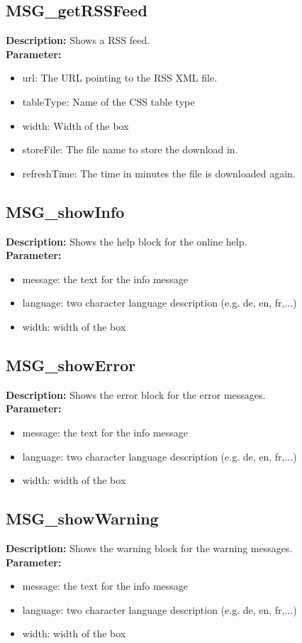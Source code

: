 \subsection{MSG\_getRSSFeed}
\textbf{Description:} Shows a RSS feed.\\
\textbf{Parameter:}
\begin{itemize}
\item url: The URL pointing to the RSS XML file.
\item tableType: Name of the CSS table type
\item width: Width of the box
\item storeFile: The file name to store the download in.
\item refreshTime: The time in minutes the file is downloaded again.
\end{itemize}

\subsection{MSG\_showInfo}
\textbf{Description:} Shows the help block for the online help.\\
\textbf{Parameter:}
\begin{itemize}
\item message: the text for the info message
\item language: two character language description (e.g. de, en, fr,...)
\item width: width of the box
\end{itemize}

\subsection{MSG\_showError}
\textbf{Description:} Shows the error block for the error messages.\\
\textbf{Parameter:}
\begin{itemize}
\item message: the text for the info message
\item language: two character language description (e.g. de, en, fr,...)
\item width: width of the box
\end{itemize}

\subsection{MSG\_showWarning}
\textbf{Description:} Shows the warning block for the warning messages.\\
\textbf{Parameter:}
\begin{itemize}
\item message: the text for the info message
\item language: two character language description (e.g. de, en, fr,...)
\item width: width of the box
\end{itemize}

